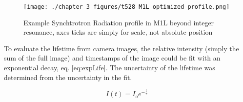 \begin{figure}
	\centering
	\texttt{[image: ./chapter\_3\_figures/t528\_M1L\_optimized\_profile.png]}
	\caption{Example Synchtrotron Radiation profile in M1L beyond integer resonance, axes ticks are simply for scale, not absolute position}
	\label{fig:synchBackground}
\end{figure}

To evaluate the lifetime from camera images, the relative intensity (simply the sum of the full image) and timestamps of the image could be fit with an exponential decay, eq. \ref{eq:expLife}. The uncertainty of the lifetime was determined from the uncertainty in the fit.

\begin{equation}
	I(t) = I_o e^{-\frac{t}{\tau}}
	\label{eq:expLife}
\end{equation}
